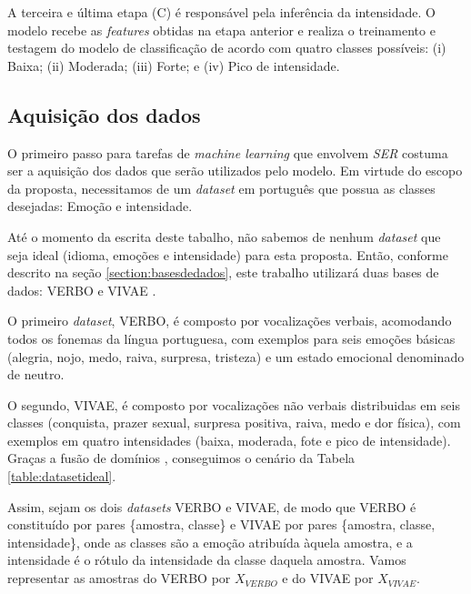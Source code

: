 A terceira e última etapa (C) é responsável pela inferência da intensidade. O modelo recebe as \textit{features} obtidas na etapa anterior e realiza o treinamento e testagem do modelo de classificação de acordo com quatro classes possíveis: (i) Baixa; (ii) Moderada; (iii) Forte; e (iv) Pico de intensidade.

\subsection{Aquisição dos dados}

O primeiro passo para tarefas de \textit{machine learning} que envolvem \textit{SER} costuma ser a aquisição dos dados que serão utilizados pelo modelo. Em virtude do escopo da proposta, necessitamos de um \textit{dataset} em português que possua as classes desejadas: Emoção e intensidade.

Até o momento da escrita deste tabalho, não sabemos de nenhum \textit{dataset} que seja ideal (idioma, emoções e intensidade) para esta proposta. Então, conforme descrito na seção \ref{section:basesdedados}, este trabalho utilizará duas bases de dados: VERBO \cite{12.21} e VIVAE \cite{16}.

O primeiro \textit{dataset}, VERBO, é composto por vocalizações verbais, acomodando todos os fonemas da língua portuguesa, com exemplos para seis emoções básicas (alegria, nojo, medo, raiva, surpresa, tristeza) e um estado emocional denominado de neutro.

O segundo, VIVAE, é composto por vocalizações não verbais distribuidas em seis classes (conquista, prazer sexual, surpresa positiva, raiva, medo e dor física), com exemplos em quatro intensidades (baixa, moderada, fote e pico de intensidade). Graças a fusão de domínios \cite{49}, conseguimos o cenário da Tabela \ref{table:datasetideal}.

Assim, sejam os dois \textit{datasets} VERBO e VIVAE, de modo que VERBO é constituído por pares \{amostra, classe\} e VIVAE por pares \{amostra, classe, intensidade\}, onde as classes são a emoção atribuída àquela amostra, e a intensidade é o rótulo da intensidade da classe daquela amostra. Vamos representar as amostras do VERBO por $X_{VERBO}$ e do VIVAE por $X_{VIVAE}$.

